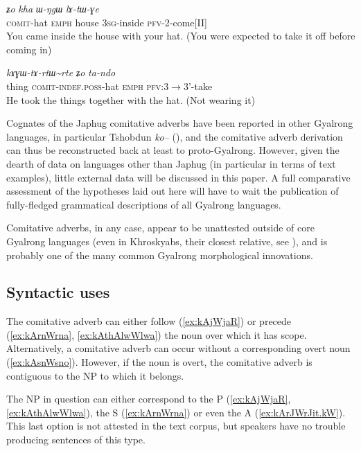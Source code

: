 \documentclass[oldfontcommands,oneside,a4paper,11pt]{article}
\newcommand{\ipa}[1]{{\phon\textit{#1}}} %
\newcommand{\tld}{\textasciitilde{}}
\begin{document}
\begin{exe}
\ex \label{ex:kAGWrtWrte}
\gll \ipa{kɤɣɯ-rtɯ\tld{}rte} 	\ipa{ʑo} 	\ipa{kha} 	\ipa{ɯ-ŋgɯ} 	\ipa{lɤ-tɯ-ɣe} 	\\
\textsc{comit}-hat \textsc{emph} house \textsc{3sg}-inside \textsc{pfv}-2-come[II] \\
\glt You came inside the house with your hat. (You were expected to take it off before coming in)
\end{exe}

\begin{exe}
\ex \label{ex:kAGWtArtWrte}
\gll  \ipa{laχtɕha} 	\ipa{kɤɣɯ-tɤ-rtɯ\tld{}rte} 	\ipa{ʑo} 	\ipa{ta-ndo}  \\
thing \textsc{comit-indef.poss}-hat \textsc{emph} \textsc{pfv}:3$\rightarrow$3'-take \\
\glt He took the things together with the hat. (Not wearing it)
\end{exe}

Cognates of the Japhug comitative adverbs have been reported in other Gyalrong languages, in particular Tshobdun \ipa{ko--} (\citealt[107]{jackson98morphology}), and the comitative adverb derivation can thus be reconstructed back at least to proto-Gyalrong. However, given the dearth of data on languages other than Japhug (in particular in terms of text examples), little external data will be discussed in this paper. A full comparative assessment of the hypotheses laid out here will have to wait the publication of fully-fledged grammatical descriptions of all Gyalrong languages. 

Comitative adverbs, in any case, appear to be unattested outside of core Gyalrong languages (even in Khroskyabs, their closest relative, see \citealt{lai13affixale}), and is probably one of the many common Gyalrong  morphological innovations.

\subsection{Syntactic uses} 

The comitative adverb can either follow (\ref{ex:kAjWjaR}) or precede (\ref{ex:kArnWrna}, \ref{ex:kAthAlwWlwa}) the noun over which it has scope. Alternatively, a comitative adverb can occur without a corresponding overt noun (\ref{ex:kAsnWsno}). However, if the noun is overt, the comitative adverb is contiguous to the NP to which it belongs. 

The NP in question can either correspond to the P (\ref{ex:kAjWjaR}, \ref{ex:kAthAlwWlwa}), the S (\ref{ex:kArnWrna}) or even the A (\ref{ex:kArJWrJit.kW}). This last option is not attested in the text corpus, but speakers have no trouble producing sentences of this type.
\end{document}
